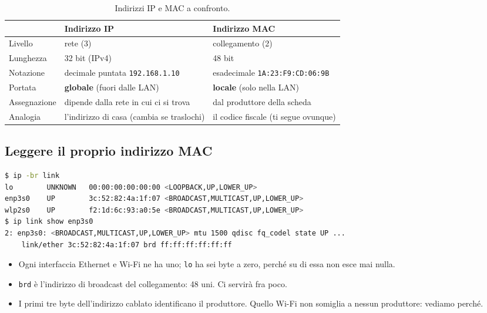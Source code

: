 \begin{table}[H]
\centering
\begin{tabular}{p{3cm}p{5.5cm}p{5.5cm}}
\toprule
 & \textbf{Indirizzo IP} & \textbf{Indirizzo MAC} \\
\midrule
Livello & rete (3) & collegamento (2) \\
Lunghezza & 32 bit (IPv4) & 48 bit \\
Notazione & decimale puntata \texttt{192.168.1.10} & esadecimale \texttt{1A:23:F9:CD:06:9B} \\
Portata & \textbf{globale} (fuori dalle LAN) & \textbf{locale} (solo nella LAN) \\
Assegnazione & dipende dalla rete in cui ci si trova & dal produttore della scheda \\
Analogia & l'indirizzo di casa (cambia se traslochi) & il codice fiscale (ti segue ovunque) \\
\bottomrule
\end{tabular}
\caption{Indirizzi IP e MAC a confronto.}
\end{table}


\subsection{Leggere il proprio indirizzo MAC}

\begin{lstlisting}[language=bash]
$ ip -br link
lo        UNKNOWN   00:00:00:00:00:00 <LOOPBACK,UP,LOWER_UP>
enp3s0    UP        3c:52:82:4a:1f:07 <BROADCAST,MULTICAST,UP,LOWER_UP>
wlp2s0    UP        f2:1d:6c:93:a0:5e <BROADCAST,MULTICAST,UP,LOWER_UP>
$ ip link show enp3s0
2: enp3s0: <BROADCAST,MULTICAST,UP,LOWER_UP> mtu 1500 qdisc fq_codel state UP ...
    link/ether 3c:52:82:4a:1f:07 brd ff:ff:ff:ff:ff:ff
\end{lstlisting}

\begin{itemize}
    \item Ogni interfaccia Ethernet e Wi-Fi ne ha uno; \texttt{lo} ha sei byte a zero, perché su di essa non esce mai nulla.
    \item \texttt{brd} è l'indirizzo di broadcast del collegamento: 48 uni. Ci servirà fra poco.
    \item I primi tre byte dell'indirizzo cablato identificano il produttore. Quello Wi-Fi non somiglia a nessun produttore: vediamo
          perché.
\end{itemize}

